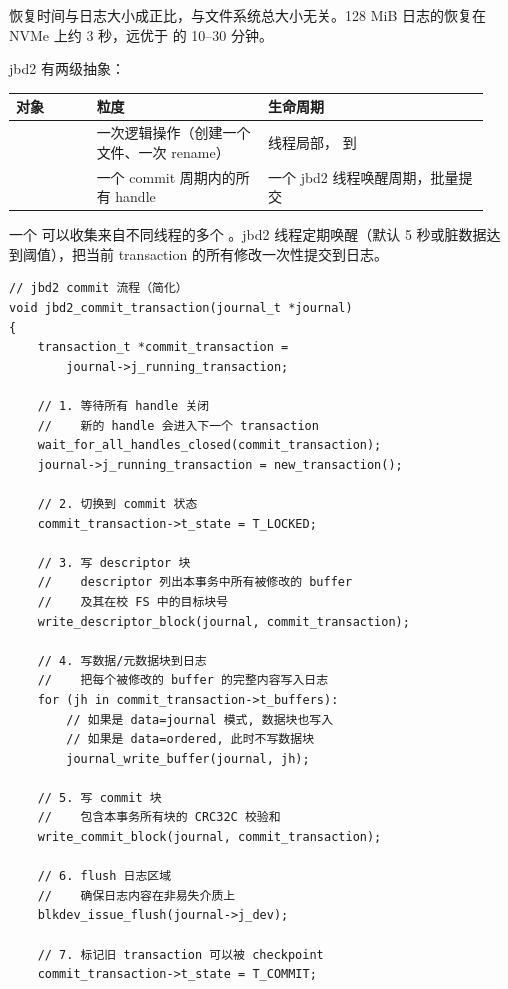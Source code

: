 \begin{filesystemlayout}
恢复时间与日志大小成正比，与文件系统总大小无关。128 MiB 日志的恢复在 NVMe 上约 3 秒，远优于  的 10--30 分钟。


jbd2 有两级抽象：

\begin{longtable}{|F{0.16\linewidth}|F{0.34\linewidth}|F{0.44\linewidth}|}
\toprule
{}
对象 & 粒度 & 生命周期 \\
\midrule
{} & 一次逻辑操作（创建一个文件、一次 rename） & 线程局部， 到  \\\tablerowrule
{} & 一个 commit 周期内的所有 handle & 一个 jbd2 线程唤醒周期，批量提交 \\
\bottomrule
\end{longtable}

一个  可以收集来自不同线程的多个 。jbd2 线程定期唤醒（默认 5 秒或脏数据达到阈值），把当前 transaction 的所有修改一次性提交到日志。

\begin{lstlisting}
// jbd2 commit 流程（简化）
void jbd2_commit_transaction(journal_t *journal)
{
    transaction_t *commit_transaction =
        journal->j_running_transaction;

    // 1. 等待所有 handle 关闭
    //    新的 handle 会进入下一个 transaction
    wait_for_all_handles_closed(commit_transaction);
    journal->j_running_transaction = new_transaction();

    // 2. 切换到 commit 状态
    commit_transaction->t_state = T_LOCKED;

    // 3. 写 descriptor 块
    //    descriptor 列出本事务中所有被修改的 buffer
    //    及其在校 FS 中的目标块号
    write_descriptor_block(journal, commit_transaction);

    // 4. 写数据/元数据块到日志
    //    把每个被修改的 buffer 的完整内容写入日志
    for (jh in commit_transaction->t_buffers):
        // 如果是 data=journal 模式, 数据块也写入
        // 如果是 data=ordered, 此时不写数据块
        journal_write_buffer(journal, jh);

    // 5. 写 commit 块
    //    包含本事务所有块的 CRC32C 校验和
    write_commit_block(journal, commit_transaction);

    // 6. flush 日志区域
    //    确保日志内容在非易失介质上
    blkdev_issue_flush(journal->j_dev);

    // 7. 标记旧 transaction 可以被 checkpoint
    commit_transaction->t_state = T_COMMIT;


\end{lstlisting}
\end{filesystemlayout}
